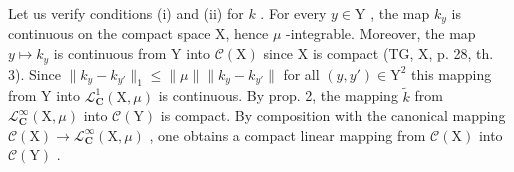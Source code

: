 Let us verify conditions (i) and (ii) for \(k\) . For every \(y \in \mathrm{Y}\) , the map \(k_y\) is continuous on the compact space X, hence \(\mu\) -integrable. Moreover, the map \(y \mapsto k_y\) is continuous from Y into \(\mathcal{C}(\mathrm{X})\) since X is compact (TG, X, p. 28, th. 3). Since \(\| k_y - k_{y'} \|_1 \leqslant \| \mu \| \| k_y - k_{y'} \|\) for all \((y, y') \in \mathrm{Y}^2\) this mapping from Y into \(\mathcal{L}_{\mathbf{C}}^1(\mathrm{X}, \mu)\) is continuous. By prop. 2, the mapping \(\widetilde{k}\) from \(\mathcal{L}_{\mathbf{C}}^\infty(\mathrm{X}, \mu)\) into \(\mathcal{C}(\mathrm{Y})\) is compact. By composition with the canonical mapping \(\mathcal{C}(\mathrm{X}) \to \mathcal{L}_{\mathbf{C}}^\infty(\mathrm{X}, \mu)\) , one obtains a compact linear mapping from \(\mathcal{C}(\mathrm{X})\) into \(\mathcal{C}(\mathrm{Y})\) .
\relax{}
